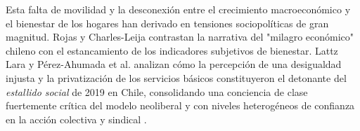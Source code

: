 Esta falta de movilidad y la desconexión entre el crecimiento macroeconómico y el bienestar de los hogares han derivado en tensiones sociopolíticas de gran magnitud. Rojas y Charles-Leija \parencite*{RojasCharlesLeija2022} contrastan la narrativa del "milagro económico" chileno con el estancamiento de los indicadores subjetivos de bienestar. Lattz Lara \parencite*{LattzLara2026} y Pérez-Ahumada et al. \parencite*{Perez-Ahumadaetal2026} analizan cómo la percepción de una desigualdad injusta y la privatización de los servicios básicos constituyeron el detonante del \textit{estallido social} de 2019 en Chile, consolidando una conciencia de clase fuertemente crítica del modelo neoliberal y con niveles heterogéneos de confianza en la acción colectiva y sindical \parencite{Perez-AhumadaCarrasco2025}.